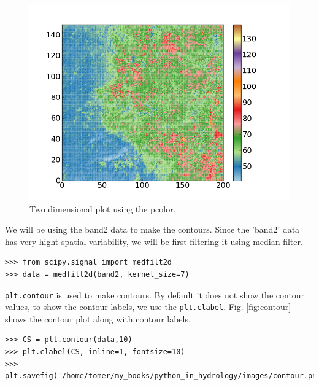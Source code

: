 \documentclass[10pt]{book}
\begin{document}
\beforefig
\begin{figure}[h!]
  \centering
    \includegraphics[scale=0.5]{images/pcolor.png}
  \caption{Two dimensional plot using the pcolor.}
   \label{fig:pcolor}
\end{figure}
\afterfig

We will be using the band2 data to make the contours. Since the 'band2' data has very hight spatial variability, we will be first filtering it using median filter. 
\beforeverb \begin{verbatim}
>>> from scipy.signal import medfilt2d
>>> data = medfilt2d(band2, kernel_size=7)
\end{verbatim} \afterverb
{}

\verb"plt.contour" is used to make contours. By default it does not show the contour values, to show the contour labels, we use the \verb"plt.clabel". Fig. \ref{fig:contour} shows the contour plot along with contour labels. 
\beforeverb \begin{verbatim}
>>> CS = plt.contour(data,10)
>>> plt.clabel(CS, inline=1, fontsize=10)
>>> plt.savefig('/home/tomer/my_books/python_in_hydrology/images/contour.png')
\end{verbatim} \afterverb
{}
\end{document}
